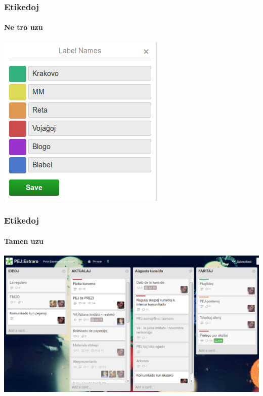   \begin{frame}
    \frametitle{Etikedoj}
	\framesubtitle{Ne tro uzu}

	\begin{center}
		\includegraphics[scale=0.5]{ekranoj/etikedoj}
	\end{center}

  \end{frame}



  \begin{frame}
    \frametitle{Etikedoj}
	\framesubtitle{Tamen uzu}
	
	
	\begin{center}
		\includegraphics[scale=0.3]{ekranoj/etikedoj-estraro}
	\end{center}

	
  \end{frame}


